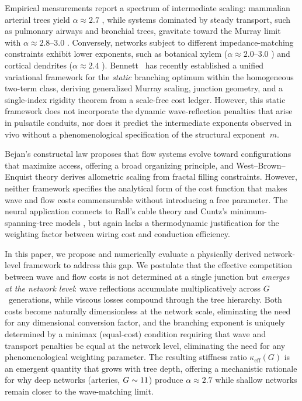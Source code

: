 \documentclass[11pt,a4paper]{article}
\theoremstyle{remark}
\begin{document}
Empirical measurements report a spectrum of intermediate scaling: mammalian
arterial trees yield $\alpha \approx 2.7$ \cite{Kassab1993, Zamir1999}, while
systems dominated by steady transport, such as pulmonary airways and bronchial
trees, gravitate toward the Murray limit with $\alpha \approx 2.8$--$3.0$
\cite{Weibel1963}. Conversely, networks subject to different impedance-matching
constraints exhibit lower exponents, such as botanical xylem ($\alpha \approx
2.0$--$3.0$ \cite{McCulloh2003, Savage2010}) and cortical dendrites ($\alpha
\approx 2.4$ \cite{Cuntz2010}).
Bennett~\cite{bennett2025} has recently established a unified
variational framework for the \emph{static} branching optimum within the
homogeneous two-term class, deriving generalized Murray scaling,
junction geometry, and a single-index rigidity theorem from a scale-free
cost ledger.
However, this static framework does not incorporate the dynamic
wave-reflection penalties that arise in pulsatile conduits, nor does it
predict the intermediate exponents observed in vivo without a
phenomenological specification of the structural exponent~$m$.

Bejan's constructal law \cite{Bejan1997,Bejan2000} proposes that flow systems
evolve toward configurations that maximize access, offering a broad organizing
principle, and West--Brown--Enquist theory \cite{WBE1997} derives allometric
scaling from fractal filling constraints.
However, neither framework specifies the analytical form of the cost function
that makes wave and flow costs commensurable without introducing a free
parameter.
The neural application connects to Rall's cable theory \cite{Rall1959} and
Cuntz's minimum-spanning-tree models \cite{Cuntz2010}, but again lacks a
thermodynamic justification for the weighting factor between wiring cost and
conduction efficiency.

In this paper, we propose and numerically evaluate a physically derived
network-level framework to address this gap.
We postulate that the effective competition between wave and flow costs is not
determined at a single junction but \emph{emerges at the network level}: wave
reflections accumulate multiplicatively across $G$~generations, while viscous
losses compound through the tree hierarchy.
Both costs become naturally dimensionless at the network scale, eliminating the
need for any dimensional conversion factor, and the branching exponent is
uniquely determined by a minimax (equal-cost) condition requiring that wave and
transport penalties be equal at the network level, eliminating the need for any
phenomenological weighting parameter.
The resulting stiffness ratio $\kappa_\mathrm{eff}(G)$ is an emergent quantity
that grows with tree depth, offering a mechanistic rationale for why deep
networks (arteries, $G \sim 11$) produce $\alpha \approx 2.7$ while shallow
networks remain closer to the wave-matching limit.
\end{document}

